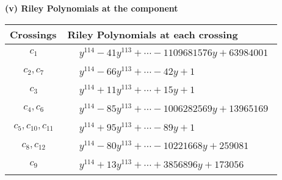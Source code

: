 \documentclass[1p]{elsarticle_modified}
\theoremstyle{definition}
\begin{document}
\newpage\renewcommand{\arraystretch}{1}
\flushleft \textbf{(v) Riley Polynomials at the component}\newline \\
\begin{tabular}{m{50pt}|m{274pt}}
Crossings & \hspace{64pt}Riley Polynomials at each crossing \\
\hline $$\begin{aligned}c_{1}\end{aligned}$$&$\begin{aligned}
&y^{114}-41 y^{113}+\cdots-1109681576 y+63984001
\end{aligned}$\\
\hline $$\begin{aligned}c_{2},c_{7}\end{aligned}$$&$\begin{aligned}
&y^{114}-66 y^{113}+\cdots-42 y+1
\end{aligned}$\\
\hline $$\begin{aligned}c_{3}\end{aligned}$$&$\begin{aligned}
&y^{114}+11 y^{113}+\cdots+15 y+1
\end{aligned}$\\
\hline $$\begin{aligned}c_{4},c_{6}\end{aligned}$$&$\begin{aligned}
&y^{114}-85 y^{113}+\cdots-1006282569 y+13965169
\end{aligned}$\\
\hline $$\begin{aligned}c_{5},c_{10},c_{11}\end{aligned}$$&$\begin{aligned}
&y^{114}+95 y^{113}+\cdots-89 y+1
\end{aligned}$\\
\hline $$\begin{aligned}c_{8},c_{12}\end{aligned}$$&$\begin{aligned}
&y^{114}-80 y^{113}+\cdots-10221668 y+259081
\end{aligned}$\\
\hline $$\begin{aligned}c_{9}\end{aligned}$$&$\begin{aligned}
&y^{114}+13 y^{113}+\cdots+3856896 y+173056
\end{aligned}$\\
\hline
\end{tabular}\\~\\
\end{document}
